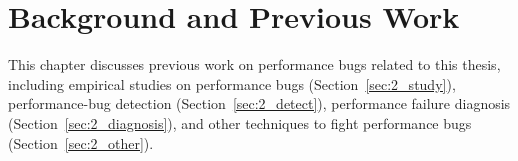 \chapter[Background and Previous Work]{Background and Previous Work}
\label{chap:background}

This chapter discusses previous work on performance bugs related to this thesis, 
including empirical studies on performance bugs (Section~\ref{sec:2_study}), 
performance-bug detection (Section~\ref{sec:2_detect}), 
performance failure diagnosis (Section~\ref{sec:2_diagnosis}), 
and other techniques to fight performance bugs (Section~\ref{sec:2_other}). 





